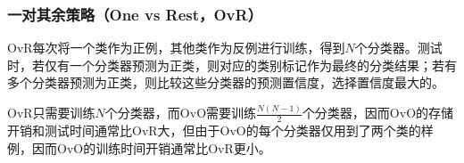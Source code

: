 \subsubsection{一对其余策略（One vs Rest，OvR）}
OvR每次将一个类作为正例，其他类作为反例进行训练，得到$N个$分类器。测试时，若仅有一个分类器预测为正类，则对应的类别标记作为最终的分类结果；若有多个分类器预测为正类，则比较这些分类器的预测置信度，选择置信度最大的。

OvR只需要训练$N$个分类器，而OvO需要训练$\frac{N(N-1)}{2}$个分类器，因而OvO的存储开销和测试时间通常比OvR大，但由于OvO的每个分类器仅用到了两个类的样例，因而OvO的训练时间开销通常比OvR更小。
